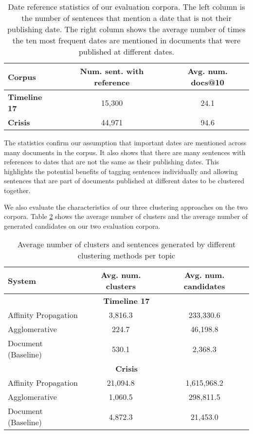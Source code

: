 \documentclass[a4paper,BCOR=10mm]{report}
\numberwithin{lemma}{chapter}
\numberwithin{definition}{chapter}
\begin{document}
\begin{table}
\centering\begin{tabular}{|l|cc|}
\hline
\textbf{Corpus} & \textbf{Num. sent. with reference} & \textbf{Avg. num. docs@10} \\\hline
\textbf{Timeline 17} & 15,300 & 24.1 \\
\textbf{Crisis} & 44,971 & 94.6 \\\hline
\end{tabular}

\caption{Date reference statistics of our evaluation corpora. The left column is the number of sentences that mention a date that is not their publishing date. The right column shows the average number of times the ten most frequent dates are mentioned in documents that were published at different dates.}
\label{tab:datestats}
\end{table}

The statistics confirm our assumption that important dates are mentioned across many documents in the corpus. It also shows that there are many sentences with references to dates that are not the same as their publishing dates. This highlights the potential benefits of tagging sentences individually and allowing sentences that are part of documents published at different dates to be clustered together.

We also evaluate the characteristics of our three clustering approaches on the two corpora.
Table \ref{tab:genstats} shows the average number of clusters and the average number of generated candidates on our two evaluation corpora.

\begin{table}
\centering\begin{tabular}{|l|cc|}
\hline
\textbf{System} & \textbf{Avg. num. clusters} & \textbf{Avg. num. candidates} \\\hline\hline
\multicolumn{3}{|c|}{\textbf{Timeline 17}}\\\hline
Affinity Propagation & 3,816.3 & 233,330.6 \\
Agglomerative  & 224.7 & 46,198.8 \\
Document (Baseline) & 530.1 & 2,368.3 \\\hline
\multicolumn{3}{|c|}{\textbf{Crisis}}\\\hline
Affinity Propagation & 21,094.8 & 1,615,968.2 \\
Agglomerative & 1,060.5 & 298,811.5 \\
Document (Baseline) & 4,872.3 & 21,453.0 \\\hline
\end{tabular}
\caption{Average number of clusters and sentences generated by different clustering methods per topic}
\label{tab:genstats}
\end{table}
\end{document}
